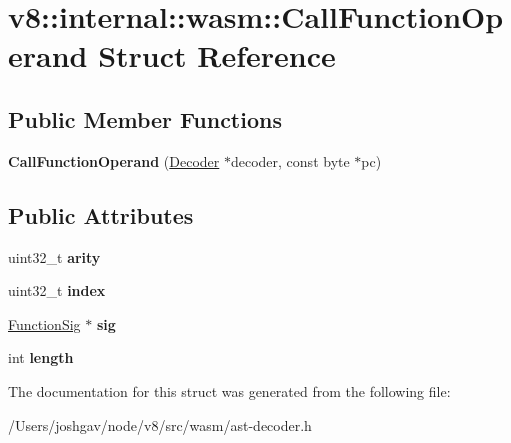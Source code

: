 \hypertarget{structv8_1_1internal_1_1wasm_1_1_call_function_operand}{}\section{v8\+:\+:internal\+:\+:wasm\+:\+:Call\+Function\+Operand Struct Reference}
\label{structv8_1_1internal_1_1wasm_1_1_call_function_operand}
\subsection*{Public Member Functions}
\begin{DoxyCompactItemize}
\item 
{\bfseries Call\+Function\+Operand} (\hyperlink{classv8_1_1internal_1_1wasm_1_1_decoder}{Decoder} $\ast$decoder, const byte $\ast$pc)\hypertarget{structv8_1_1internal_1_1wasm_1_1_call_function_operand_a00153ccb3d3d36e4f83100cbdda00091}{}\label{structv8_1_1internal_1_1wasm_1_1_call_function_operand_a00153ccb3d3d36e4f83100cbdda00091}

\end{DoxyCompactItemize}
\subsection*{Public Attributes}
\begin{DoxyCompactItemize}
\item 
uint32\+\_\+t {\bfseries arity}\hypertarget{structv8_1_1internal_1_1wasm_1_1_call_function_operand_a268a2459216691eb6eec46f5627fa924}{}\label{structv8_1_1internal_1_1wasm_1_1_call_function_operand_a268a2459216691eb6eec46f5627fa924}

\item 
uint32\+\_\+t {\bfseries index}\hypertarget{structv8_1_1internal_1_1wasm_1_1_call_function_operand_a165628d727ea5523c411c7bfd7527773}{}\label{structv8_1_1internal_1_1wasm_1_1_call_function_operand_a165628d727ea5523c411c7bfd7527773}

\item 
\hyperlink{classv8_1_1internal_1_1_signature}{Function\+Sig} $\ast$ {\bfseries sig}\hypertarget{structv8_1_1internal_1_1wasm_1_1_call_function_operand_a406ec758035c83ba10e1e45c931ea5be}{}\label{structv8_1_1internal_1_1wasm_1_1_call_function_operand_a406ec758035c83ba10e1e45c931ea5be}

\item 
int {\bfseries length}\hypertarget{structv8_1_1internal_1_1wasm_1_1_call_function_operand_a2dc6255ef4ad27493f454ae41f4df747}{}\label{structv8_1_1internal_1_1wasm_1_1_call_function_operand_a2dc6255ef4ad27493f454ae41f4df747}

\end{DoxyCompactItemize}


The documentation for this struct was generated from the following file\+:\begin{DoxyCompactItemize}
\item 
/\+Users/joshgav/node/v8/src/wasm/ast-\/decoder.\+h\end{DoxyCompactItemize}
